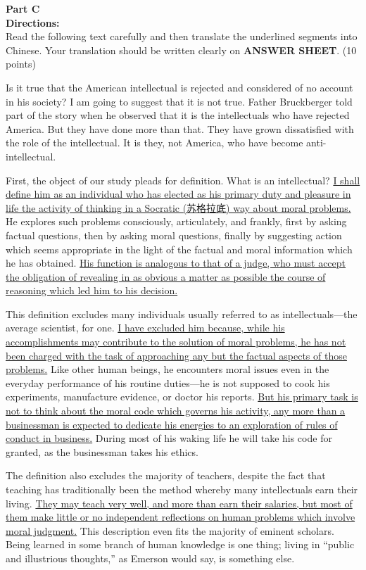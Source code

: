 \noindent
\textbf{Part C}\\
\textbf{Directions:}\\
Read the following text carefully and then translate the underlined
segments into Chinese. Your translation should be written clearly on
\textbf{ANSWER SHEET}. (10 points)


\TiGanSpace

Is it true that the American intellectual is rejected and considered of
no account in his society? I am going to suggest that it is not true.
Father Bruckberger told part of the story when he observed that it is
the intellectuals who have rejected America. But they have done more
than that. They have grown dissatisfied with the role of the
intellectual. It is they, not America, who have become
anti-intellectual.

First, the object of our study pleads for definition. What is an
intellectual? \transnum \uline{I shall define him as an individual who
	has elected as his primary duty and pleasure in life the activity of
	thinking in a Socratic (苏格拉底) way about moral problems.} He explores
such problems consciously, articulately, and frankly, first by asking
factual questions, then by asking moral questions, finally by suggesting
action which seems appropriate in the light of the factual and moral
information which he has obtained. \transnum \uline{His function is
	analogous to that of a judge, who must accept the obligation of
	revealing in as obvious a matter as possible the course of reasoning
	which led him to his decision.}

This definition excludes many individuals usually referred to as
intellectuals---the average scientist, for one. \transnum \uline{I have
	excluded him because, while his accomplish\-ments may contribute to the
	solution of moral problems, he has not been charged with the task of
	approaching any but the factual aspects of those problems.} Like other
human beings, he encounters moral issues even in the everyday
performance of his routine duties---he is not supposed to cook his
experiments, manufacture evidence, or doctor his reports.
\transnum \uline{But his primary task is not to think about the moral
	code which governs his activity, any more than a businessman is expected
	to dedicate his energies to an exploration of rules of conduct in
	business.} During most of his waking life he will take his code for
granted, as the businessman takes his ethics.

The definition also excludes the majority of teachers, despite the fact
that teaching has traditionally been the method whereby many
intellectuals earn their living. \transnum \uline{They may teach very
	well, and more than earn their salaries, but most of them make little or
	no independent reflections on human problems which involve moral
	judgment.} This description even fits the majority of eminent scholars.
Being learned in some branch of human knowledge is one thing; living in
``public and illustrious thoughts,'' as Emerson would say, is something
else.




